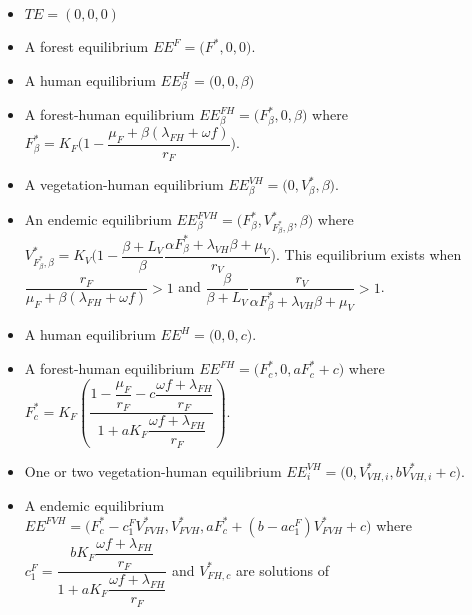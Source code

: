 \documentclass{article}
\newcommand{\lf}{\lambda_{FH}}
\newcommand{\lv}{\lambda_{VH}}
\newcommand{\Fbeta}{F^*_\beta}
\newcommand{\VbetaF}{V^*_{\Fbeta, \beta}}
\newcommand{\FHterme}{\omega f + \lf}
\begin{document}
\begin{itemize}
\item $TE = (0,0,0)$
\item A forest equilibrium $EE^F = \Big(F^*, 0, 0 \Big) $.
\item A human equilibrium $EE^H_\beta = \Big(0,0,\beta \Big)$
\item A forest-human equilibrium $EE^{FH}_\beta = \Big(F^*_\beta, 0, \beta\Big)$ where $F^*_\beta = K_F \Big(1-\dfrac{\mu_F + \beta(\lf + \omega f)}{r_F} \Big)$.
\item A vegetation-human equilibrium $EE^{VH}_\beta = \Big(0, V^*_{\beta}, \beta \Big)$.
\item An endemic equilibrium $EE_\beta^{FVH} = \Big(F^*_\beta, V^*_{F^*_\beta, \beta}, \beta \Big)$ where $\VbetaF = K_V \Big(1- \dfrac{\beta +L_V}{\beta} \dfrac{\alpha \Fbeta + \lv \beta + \mu_V}{r_V} \Big)$. This equilibrium exists  when $\dfrac{r_F}{\mu_F + \beta(\lf + \omega f)} > 1$ and $\dfrac{\beta}{\beta + L_V} \dfrac{r_V}{\alpha \Fbeta + \lv \beta + \mu_V} > 1$.


\item A human equilibrium $EE^H = \Big(0,0,c\Big)$.
\item A forest-human equilibrium $EE^{FH} = \Big(F^*_c, 0, a F^*_c + c \Big)$ where $F^*_{c} = K_F \left( \dfrac{1 - \dfrac{\mu_F}{r_F} - c \dfrac{\omega f + \lf}{r_F}}{1 + a K_F \dfrac{\omega f + \lf}{r_F}} \right)$.
\item One or two vegetation-human equilibrium $EE^{VH}_i = \Big(0, V^*_{VH, i}, bV^*_{VH, i}+c \Big)$.
\item A endemic equilibrium $EE^{FVH} = \Big(F^*_c - c_1^FV^*_{FVH}, V^*_{FVH}, aF^*_c+(b-ac_1^F)V^*_{FVH}+c \Big)$ where $c^F_1 = \dfrac{bK_F \dfrac{\FHterme}{r_F} }{1 + aK_F \dfrac{\FHterme}{r_F}}$
and $V^*_{FH, c}$ are solutions of 
\end{itemize}
\end{document}
